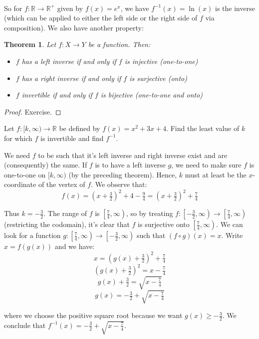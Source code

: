 \documentclass[12pt, a4paper, titlepage, twoside]{article}
\newcommand*{\R}{\mathbb{R}}
\newtheorem*{theorem*}{Theorem}
\newcounter{excount}[subsection]
\begin{document}
	\paragraph{}
	So for $f : \R \to \R^+$ given by $f(x) = e^x$, we have $f^{-1}(x) = \ln(x)$ is the inverse (which can be applied to either the left side
	or the right side of $f$ via composition). We also have another property:\\
	
	\begin{pf}
		\begin{theorem*}
			Let $f : X \to Y$ be a function. Then:
			\begin{itemize}
				\item $f$ has a left inverse if and only if $f$ is injective (one-to-one)
				\item $f$ has a right inverse if and only if $f$ is surjective (onto)
				\item $f$ invertible if and only if $f$ is bijective (one-to-one and onto)
			\end{itemize}
		\end{theorem*}
		
		\tcbline
		
		\begin{proof}
			Exercise.
		\end{proof}
	\end{pf}
	
	\hfill
	
	\begin{ex}
		Let $f : [k, \infty) \to \R$ be defined by $f(x) = x^2+3x+4$. Find the least value of $k$ for which $f$ is invertible and find
		$f^{-1}$.
		
		\hfill
		\tcbline
		\hfill
		
		We need $f$ to be such that it's left inverse and right inverse exist and are (consequently) the same. If $f$ is to have a left inverse
		$g$, we need to make sure $f$ is one-to-one on $[k, \infty)$ (by the preceding theorem). Hence, $k$ must at least be the $x$-coordinate
		of the vertex of $f$. We observe that:
		\[ f(x) = (x+\tfrac{3}{2})^2 + 4 - \tfrac{9}{4} = (x+\tfrac{3}{2})^2 + \tfrac{7}{4} \]
		
		Thus $k = -\frac{3}{2}$. The range of $f$ is $\left[\tfrac{7}{4}, \infty\right)$, so by treating $f : \left[-\tfrac{3}{2}, \infty\right) \to 
		\left[\tfrac{7}{4}, \infty\right)$ (restricting the codomain),
		it's clear that $f$ is surjective onto $\left[\tfrac{7}{4}, \infty\right)$. We can look for a function $g : \left[\tfrac{7}{4}, \infty\right) \to 
		\left[-\tfrac{3}{2}, \infty\right)$ such that $(f \circ g)(x) = x$. Write $x = f(g(x))$ and we have:
		\[ x = (g(x)+\tfrac{3}{2})^2 + \tfrac{7}{4} \]
		\[ (g(x)+\tfrac{3}{2})^2 = x - \tfrac{7}{4} \]
		\[ g(x)+\tfrac{3}{2} = \sqrt{x - \tfrac{7}{4}} \]
		\[ g(x) = - \tfrac{3}{2} + \sqrt{x - \tfrac{7}{4}} \]
		
		where we choose the positive square root because we want $g(x) \geqslant -\frac{3}{2}$. We conclude that $f^{-1}(x) = -\frac{3}{2} + 
		\sqrt{x - \frac{7}{4}}$.
	\end{ex}
	
\end{document}
